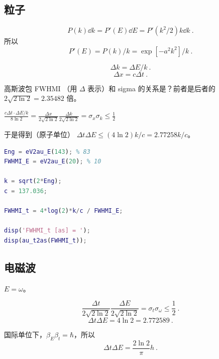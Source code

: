 
\subsection{粒子}
\begin{equation}
P(k)\dd{k} = P'(E)\dd{E} = P'(k^2/2)k\dd{k}~.
\end{equation}
所以
\begin{equation}
P'(E) = P(k)/k = \exp[-a^2 k^2]/k~.
\end{equation}

\begin{equation}
\Delta k = \Delta E/k~.
\end{equation}
\begin{equation}
\Delta x = c\Delta t~.
\end{equation}


高斯波包 FWHMI （用 $\Delta$ 表示）和 sigma 的关系是？前者是后者的 $2\sqrt{2\ln 2} = 2.35482$ 倍。

$\frac{c\Delta t \cdot \Delta E/k}{8\ln 2} = \frac{\Delta x}{2\sqrt{2\ln 2}}\frac{\Delta k}{2\sqrt{2\ln 2}} = \sigma_x \sigma_k \leq \frac{1}{2}$

于是得到（原子单位） $\Delta t\Delta E \leq (4\ln 2)k/c = 2.77258 k/c$。

\begin{lstlisting}[language=matlab]
Eng = eV2au_E(143); % 83
FWHMI_E = eV2au_E(20); % 10

k = sqrt(2*Eng);
c = 137.036;

FWHMI_t = 4*log(2)*k/c / FWHMI_E;

disp('FWHMI_t [as] = ');
disp(au_t2as(FWHMI_t));
\end{lstlisting}

\subsection{电磁波}
$E = \omega$。

\begin{equation}
\frac{\Delta t}{2\sqrt{2\ln 2}}\frac{\Delta E}{2\sqrt{2\ln 2}} = \sigma_t \sigma_\omega \leq \frac{1}{2}~.
\end{equation}
\begin{equation}
\Delta t\Delta E = 4\ln 2 = 2.772589~.
\end{equation}

国际单位下，$\beta_E\beta_t = \hbar$，所以
\begin{equation}
\Delta t \Delta E  = \frac{2\ln 2}{\pi}h~.
\end{equation}
